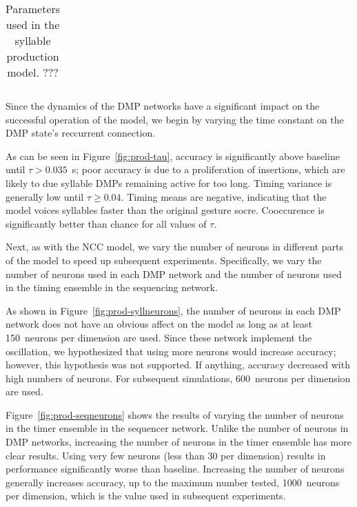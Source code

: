 \begin{table}[ht!]
  \begin{small}
    \begin{tabular}{}
    \end{tabular}
 \end{small}
  \caption[Parameters for syllable production model.]{
    Parameters used in the syllable production model. ???}
\label{tab:prod}
\end{table}

Since the dynamics of the DMP networks
have a significant impact
on the successful operation of the model,
we begin by varying
the time constant on
the DMP state's reccurrent connection.


As can be seen in Figure~\ref{fig:prod-tau},
accuracy is significantly above baseline
until $\tau > 0.035$~s;
poor accuracy is due to a proliferation
of insertions,
which are likely to due syllable DMPs
remaining active for too long.
Timing variance is generally low
until $\tau \ge 0.04$.
Timing means are negative,
indicating that the model
voices syllables faster
than the original gesture socre.
Cooccurence is significantly
better than chance for all values of $\tau$.

Next, as with the NCC model,
we vary the number of neurons
in different parts of the model
to speed up subsequent experiments.
Specifically, we vary the number of neurons
used in each DMP network and
the number of neurons used in the
timing ensemble in the sequencing network.


As shown in Figure~\ref{fig:prod-syllneurons},
the number of neurons in each DMP network
does not have an obvious affect
on the model as long as at least
150~neurons per dimension are used.
Since these network implement
the oscillation, we hypothesized
that using more neurons would
increase accuracy;
however, this hypothesis was not supported.
If anything, accuracy decreased with
high numbers of neurons.
For subsequent simulations,
600~neurons per dimension are used.


Figure~\ref{fig:prod-seqneurons}
shows the results of varying
the number of neurons in the
timer ensemble in the sequencer network.
Unlike the number of neurons
in DMP networks,
increasing the number of neurons
in the timer ensemble has
more clear results.
Using very few neurons
(less than 30 per dimension)
results in performance
significantly worse than baseline.
Increasing the number of neurons
generally increases accuracy,
up to the maximum number tested,
1000~neurons per dimension,
which is the value used
in subsequent experiments.

